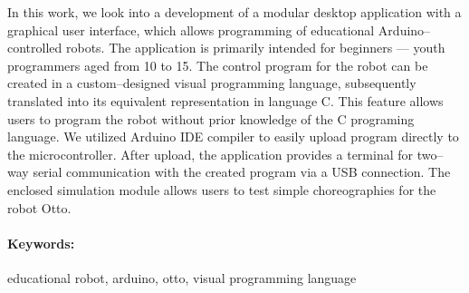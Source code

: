 \documentclass[12pt, twoside]{book}
\begin{document}
In this work, we look into a development of a modular desktop application with a graphical user interface, which allows programming of educational Arduino--controlled robots. The application is primarily intended for beginners --- youth programmers aged from 10 to 15. The control program for the robot can be created in a custom--designed visual programming language, subsequently translated into its equivalent representation in language C. This feature allows users to program the robot without prior knowledge of the C programing language. We utilized Arduino IDE compiler to easily upload program directly to the microcontroller. After upload, the application provides a terminal for two--way serial communication with the created program via a USB connection. The enclosed simulation module allows users to test simple choreographies for the robot Otto.

\paragraph*{Keywords:} educational robot, arduino, otto, visual programming language


%
%



\newpage 

\tableofcontents



\newpage 

\listoffigures


\mainmatter



 







\end{document}
